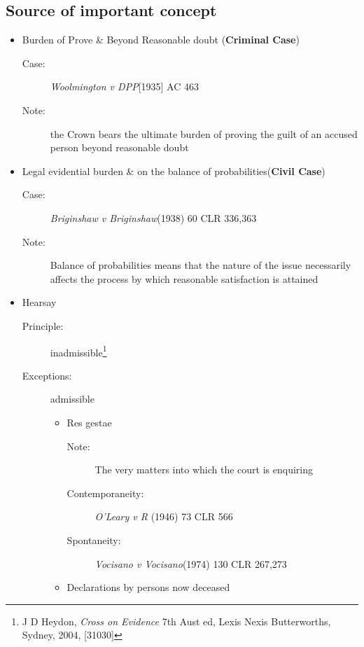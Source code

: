 \subsection*{Source of important concept}
\begin{itemize}
    \item Burden of Prove \& Beyond Reasonable doubt (\textbf{Criminal Case})
        \begin{description}
            \item[Case:]\textit{Woolmington v DPP}[1935] AC 463
            \item[Note:]the Crown bears the ultimate burden of proving the guilt of an accused person beyond reasonable doubt 
        \end{description}
    \item Legal evidential burden \& on the balance of probabilities(\textbf{Civil Case})
        \begin{description}
            \item[Case:] \textit{Briginshaw v Briginshaw}(1938) 60 CLR 336,363
            \item[Note:]Balance of probabilities means that the nature of the issue necessarily affects the process by which reasonable satisfaction is attained
        \end{description}
    \item Hearsay
        \begin{description}
            \item[Principle:] inadmissible\footnote{J D Heydon, \textit{Cross on Evidence} 7th Aust ed, Lexis Nexis Butterworths, Sydney, 2004, [31030]}
            \item[Exceptions:] admissible
                \begin{itemize}
                    \item Res gestae
                        \begin{description}
                            \item[Note:]The very matters into which the court is enquiring
                            \item[Contemporaneity:] \textit{O'Leary v R} (1946) 73 CLR 566
                            \item[Spontaneity:]\textit{Vocisano v Vocisano}(1974) 130 CLR 267,273
                        \end{description}
                    \item Declarations by persons now deceased
                        \begin{description}

\end{description}
\end{itemize}
\end{description}
\end{itemize}
